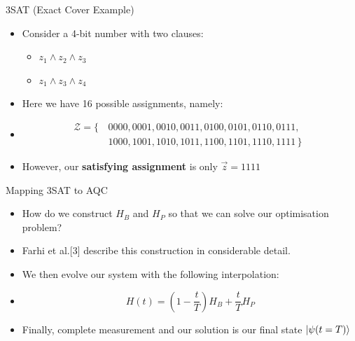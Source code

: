 \documentclass[
  ignorenonframetext,
]{beamer}
\providecommand{\tightlist}{%
  \setlength{\itemsep}{0pt}\setlength{\parskip}{0pt}}
\begin{document}
\begin{frame}{3SAT (Exact Cover Example)}
\protect\hypertarget{sat-exact-cover-example}{}

\begin{itemize}[<+->]
\tightlist
\item
  Consider a 4-bit number with two clauses:

  \begin{itemize}[<+->]
  \tightlist
  \item
    \(z_1 \land z_2 \land z_3\)
  \item
    \(z_1 \land z_3 \land z_4\)
  \end{itemize}
\item
  Here we have 16 possible assignments, namely:
\item
  \begin{align*}
  \mathcal{Z} = \{\,
  & 0000, 0001, 0010, 0011, 0100, 0101, 0110, 0111, \\
  & 1000, 1001, 1010, 1011, 1100, 1101, 1110, 1111 \,\}\enspace
  \end{align*}
\end{itemize}

\begin{itemize}[<+->]
\tightlist
\item
  However, our \textbf{satisfying assignment} is only \(\vec{z} = 1111\)
\end{itemize}

\end{frame}

\begin{frame}{Mapping 3SAT to AQC}
\protect\hypertarget{mapping-3sat-to-aqc}{}

\begin{itemize}[<+->]
\tightlist
\item
  How do we construct \(H_B\) and \(H_P\) so that we can solve our
  optimisation problem?
\item
  Farhi et al.{[}3{]} describe this construction in considerable detail.
\item
  We then evolve our system with the following interpolation:
\item
  \[
  H(t) = \left(1 - \frac{t}{T}\right)H_B + \frac{t}{T}H_P
  \]
\item
  Finally, complete measurement and our solution is our final state
  \(\ket{\psi(t=T)}\)
\end{itemize}

\end{frame}
\end{document}
